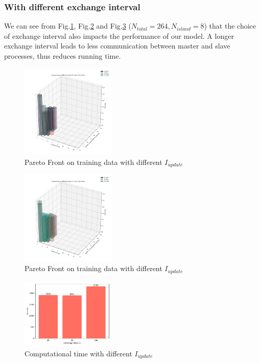 \documentclass[conference]{IEEEtran}
\begin{document}
  \subsubsection{With different exchange interval}
  We can see from Fig.\ref{diffGenTr}, Fig.\ref{diffGenT} and Fig.\ref{diffTimeGen} ($N_{total} = 264, N_{island} = 8$) that the choice of exchange interval also impacts the performance of our model. A longer exchange interval leads to less communication between master and slave processes, thus reduces running time. 
  \begin{figure}[H]
    \centering
    \includegraphics[width=0.4\textwidth]{figures/diffGenTrain.png}
    \caption{Pareto Front on training data with different $I_{update}$}\label{diffGenTr}
  \end{figure}
  \begin{figure}[H]
    \centering
    \includegraphics[width=0.4\textwidth]{figures/diffGenTest.png}
    \caption{Pareto Front on training data with different $I_{update}$}\label{diffGenT}
  \end{figure}

  \begin{figure}[H]
    \centering
    \includegraphics[width=0.4\textwidth]{figures/diffTimeGen.png}
    \caption{Computational time with different $I_{update}$}\label{diffTimeGen}
  \end{figure}
\end{document}
